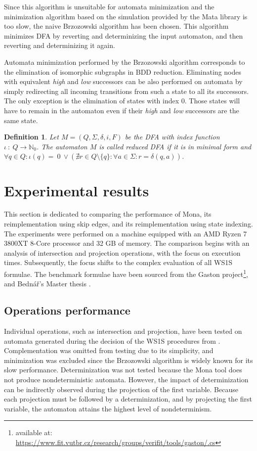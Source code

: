 \documentclass[pdflatex,sn-mathphys-num]{sn-jnl}%
\theoremstyle{thmstyleone}%
\theoremstyle{thmstyletwo}%
\theoremstyle{thmstylethree}%
\newtheorem{definition}{Definition}%
\begin{document}
        Since this algorithm is unsuitable for automata minimization and the minimization algorithm based on the simulation provided by the Mata library is too slow, the naive Brzozowski algorithm \cite{Brzozowski} has been chosen. This algorithm minimizes DFA by reverting and determinizing the input automaton, and then reverting and determinizing it again.

        Automata minimization performed by the Brzozowski algorithm corresponds to the elimination of isomorphic subgraphs in BDD reduction. Eliminating nodes with equivalent \textit{high} and \textit{low} successors can be also performed on automata by simply redirecting all incoming transitions from such a state to all its successors. The only exception is the elimination of states with index $0$. Those states will have to remain in the automaton even if their \textit{high} and \textit{low} successors are the same state.

        \vspace*{0.5em}

        \begin{definition}
            Let $M = (Q, \Sigma, \delta, i, F)$ be the DFA with index function $\iota ~:~Q \rightarrow \mathbb{N}_0$. The automaton $M$ is called reduced DFA if it is in minimal form and $\forall q \in Q : \iota(q) =~0~\lor (\nexists r \in Q\setminus\{q\} : \forall a \in \Sigma : r = \delta(q, a))$.
        \end{definition}

\section{Experimental results}
    This section is dedicated to comparing the performance of Mona, its reimplementation using skip edges, and its reimplementation using state indexing. The experiments were performed on a machine equipped with an AMD Ryzen 7 3800XT 8-Core processor and 32 GB of memory. The comparison begins with an analysis of intersection and projection operations, with the focus on execution times. Subsequently, the focus shifts to the complex evaluation of all WS1S formulae. The benchmark formulae have been sourced from the Gaston project\footnote{available at: \url{https://www.fit.vutbr.cz/research/groups/verifit/tools/gaston/.cs}}, and Bednář's Master thesis \cite{Bednar}.
    \subsection{Operations performance}
        Individual operations, such as intersection and projection, have been tested on automata generated during the decision of the WS1S procedures from \cite{Bednar}. Complementation was omitted from testing due to its simplicity, and minimization was excluded since the Brzozowski algorithm is widely known for its slow performance. Determinization was not tested because the Mona tool does not produce nondeterministic automata. However, the impact of determinization can be indirectly observed during the projection of the first variable. Because each projection must be followed by a determinization, and by projecting the first variable, the automaton attains the highest level of nondeterminism.
\end{document}
